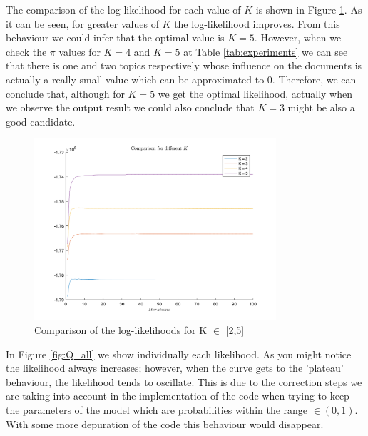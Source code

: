 \documentclass[12pt]{article}
\begin{document}
The comparison of the log-likelihood for each value of $K$ is shown in Figure \ref{fig:ll_comparison}. As it can be seen, for greater values of $K$ the log-likelihood improves. From this behaviour we could infer that the optimal value is $K=5$. However, when we check the $\pi$ values for $K=4$ and $K=5$ at Table \ref{tab:experiments} we can see that there is one and two topics respectively whose influence on the documents is actually a really small value which can be approximated to 0. Therefore, we can conclude that, although for $K=5$ we get the optimal likelihood, actually when we observe the output result we could also conclude that $K=3$ might be also a good candidate.

\begin{figure}[h]
	\centering
	\includegraphics[width=0.8\textwidth]{images/ll_comparison.png}
	\caption{Comparison of the log-likelihoods for K $\in$ [2,5]}
	\label{fig:ll_comparison}
\end{figure}

In Figure \ref{fig:Q_all} we show individually each likelihood. As you might notice the likelihood always increases; however, when the curve gets to the 'plateau' behaviour, the likelihood tends to oscillate. This is due to the correction steps we are taking into account in the implementation of the code when trying to keep the parameters of the model which are probabilities within the range $\in (0,1)$. With some more depuration of the code this behaviour would disappear.\\
\end{document}
